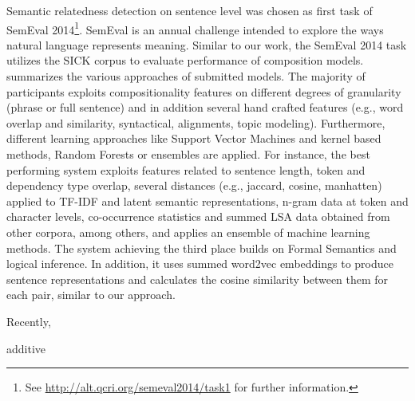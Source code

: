 Semantic relatedness detection on sentence level was chosen as first task of SemEval 2014\footnote{See \url{http://alt.qcri.org/semeval2014/task1} for further information.}. SemEval is an annual challenge intended to explore the ways natural language represents meaning. Similar to our work, the SemEval 2014 task utilizes the SICK \autocite{marelli_sick_2014} corpus to evaluate performance of composition models. \textcite{marelli_semeval-2014_2014} summarizes the various approaches of submitted models. The majority of participants exploits compositionality features on different degrees of granularity (phrase or full sentence) and in addition several hand crafted features (e.g., word overlap and similarity, syntactical, alignments, topic modeling). Furthermore, different learning approaches like Support Vector Machines \autocite{cortes_support-vector_1995} and kernel based methods, Random Forests \autocite{breiman_random_2001} or ensembles \autocite{opitz_popular_1999} are applied. For instance, the best performing system \autocite{zhao_ecnu_2014} exploits features related to sentence length, token and dependency type overlap, several distances (e.g., jaccard, cosine, manhatten) applied to \ac{TF-IDF} and latent semantic representations, n-gram data at token and character levels, co-occurrence statistics and summed \ac{LSA} data obtained from other corpora, among others, and applies an ensemble of machine learning methods.
The system achieving the third place \autocite{bjerva_meaning_2014} builds on Formal Semantics and logical inference. In addition, it uses summed word2vec \autocite{mikolov_distributed_2013} embeddings to produce sentence representations and calculates the cosine similarity between them for each pair, similar to our approach.

Recently,




additive \autocite{zanzotto_estimating_2010} \\

